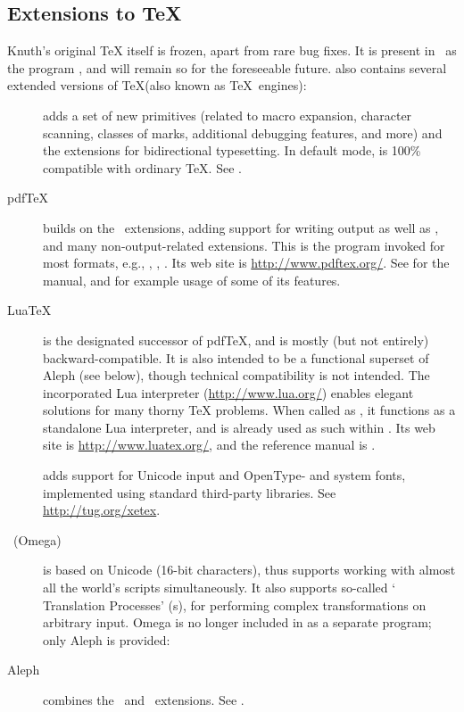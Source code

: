 \documentclass{article}
\begin{document}
\subsection{Extensions to \protect\TeX}
\label{sec:tex-extensions}

Knuth's original \TeX{} itself is frozen, apart from rare bug fixes. It
is present in \TL\ as the program , and will remain so
for the foreseeable future.  \TL{} also contains several extended versions of
\TeX (also known as \TeX\ engines):

\begin{description}

\item [\eTeX] adds a set of new primitives
\label{text:etex} (related to macro expansion, character scanning,
classes of marks, additional debugging features, and more) and the
\TeXXeT{} extensions for bidirectional typesetting.  In default mode,
\eTeX{} is 100\% compatible with ordinary \TeX. See
.

\item [pdf\TeX] builds on the \eTeX\ extensions, adding support for
writing  output as well as \dvi{}, and many non-output-related
extensions.  This is the program invoked for most formats, e.g.,
, , .  Its web site is
\url{http://www.pdftex.org/}.  See
 for the manual, and
 for example
usage of some of its features.

\item [Lua\TeX] is the designated successor of pdf\TeX,
and is mostly (but not entirely) backward-compatible.  It is also
intended to be a functional superset of Aleph (see below), though
technical compatibility is not intended. The incorporated Lua
interpreter (\url{http://www.lua.org/}) enables elegant solutions for
many thorny \TeX{} problems. When called as , it
functions as a standalone Lua interpreter, and is already used as such
within \TL.  Its web site is \url{http://www.luatex.org/}, and the
reference manual is .

\item [\XeTeX] adds support for Unicode input and OpenType- and system
fonts, implemented using standard third-party libraries.  See
\url{http://tug.org/xetex}.

\item [\OMEGA\ (Omega)] is based on Unicode (16-bit characters), thus
supports working with almost all the world's scripts simultaneously. It
also supports so-called `\OMEGA{} Translation Processes' (s),
for performing complex transformations on arbitrary input.  Omega is no
longer included in \TL{} as a separate program; only Aleph is provided:

\item [Aleph] combines the \OMEGA\ and \eTeX\ extensions.
See .

\end{description}
\end{document}
